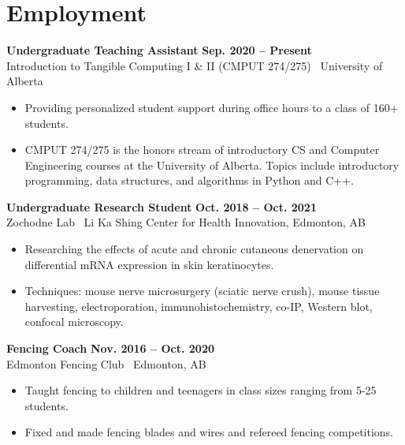 \documentclass{article}
\begin{document}
\section*{\textcolor{my_colour}{Employment}}
\vspace{-.25em} \hrulefill \vspace{.75em}

\textbf{Undergraduate Teaching Assistant} \hfill \textbf{Sep. 2020 -- Present}\\
Introduction to Tangible Computing I \& II (CMPUT 274/275) \textbar\ University of Alberta
\begin{itemize}
    \item Providing personalized student support during office hours to a class of 160+ students.
    \item CMPUT 274/275 is the honors stream of introductory CS and Computer Engineering courses at the University of Alberta. Topics include introductory programming, data structures, and algorithms in Python and C++.
\end{itemize}

\textbf{Undergraduate Research Student} \hfill \textbf{Oct. 2018 -- Oct. 2021}\\
Zochodne Lab \textbar\ Li Ka Shing Center for Health Innovation, Edmonton, AB
\begin{itemize}
    \item Researching the effects of acute and chronic cutaneous denervation on differential mRNA expression in skin keratinocytes.
    \item Techniques: mouse nerve microsurgery (sciatic nerve crush), mouse tissue harvesting, electroporation, immunohistochemistry, co-IP, Western blot, confocal microscopy.
\end{itemize}

\textbf{Fencing Coach} \hfill \textbf{Nov. 2016 -- Oct. 2020}\\
Edmonton Fencing Club \textbar\ Edmonton, AB
\begin{itemize}
    \item Taught fencing to children and teenagers in class sizes ranging from 5-25 students.
    \item Fixed and made fencing blades and wires and refereed fencing competitions.
\end{itemize}


\end{document}
